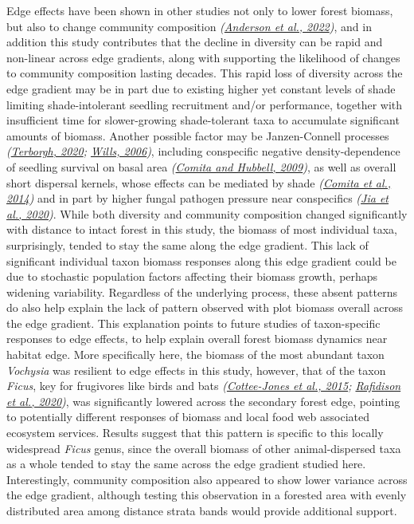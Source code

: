 \documentclass[
  12pt,
]{article}
\begin{document}
Edge effects have been shown in other studies not only to lower forest biomass, but also to change community composition \emph{(\protect\hyperlink{ref-anderson22}{Anderson et al., 2022})}, and in addition this study contributes that the decline in diversity can be rapid and non-linear across edge gradients, along with supporting the likelihood of changes to community composition lasting decades.
This rapid loss of diversity across the edge gradient may be in part due to existing higher yet constant levels of shade limiting shade-intolerant seedling recruitment and/or performance, together with insufficient time for slower-growing shade-tolerant taxa to accumulate significant amounts of biomass.
Another possible factor may be Janzen-Connell processes \emph{(\protect\hyperlink{ref-terborgh20}{Terborgh, 2020}; \protect\hyperlink{ref-wills06}{Wills, 2006})}, including conspecific negative density-dependence of seedling survival on basal area \emph{(\protect\hyperlink{ref-comita09}{Comita and Hubbell, 2009})}, as well as overall short dispersal kernels, whose effects can be mediated by shade \emph{(\protect\hyperlink{ref-comita14}{Comita et al., 2014})} and in part by higher fungal pathogen pressure near conspecifics \emph{(\protect\hyperlink{ref-jia20}{Jia et al., 2020})}.
While both diversity and community composition changed significantly with distance to intact forest in this study, the biomass of most individual taxa, surprisingly, tended to stay the same along the edge gradient.
This lack of significant individual taxon biomass responses along this edge gradient could be due to stochastic population factors affecting their biomass growth, perhaps widening variability.
Regardless of the underlying process, these absent patterns do also help explain the lack of pattern observed with plot biomass overall across the edge gradient.
This explanation points to future studies of taxon-specific responses to edge effects, to help explain overall forest biomass dynamics near habitat edge.
More specifically here, the biomass of the most abundant taxon \emph{Vochysia} was resilient to edge effects in this study, however, that of the taxon \emph{Ficus}, key for frugivores like birds and bats \emph{(\protect\hyperlink{ref-cottee-jones15}{Cottee-Jones et al., 2015}; \protect\hyperlink{ref-rafidison20}{Rafidison et al., 2020})}, was significantly lowered across the secondary forest edge, pointing to potentially different responses of biomass and local food web associated ecosystem services.
Results suggest that this pattern is specific to this locally widespread \emph{Ficus} genus, since the overall biomass of other animal-dispersed taxa as a whole tended to stay the same across the edge gradient studied here.
Interestingly, community composition also appeared to show lower variance across the edge gradient, although testing this observation in a forested area with evenly distributed area among distance strata bands would provide additional support.
\end{document}
